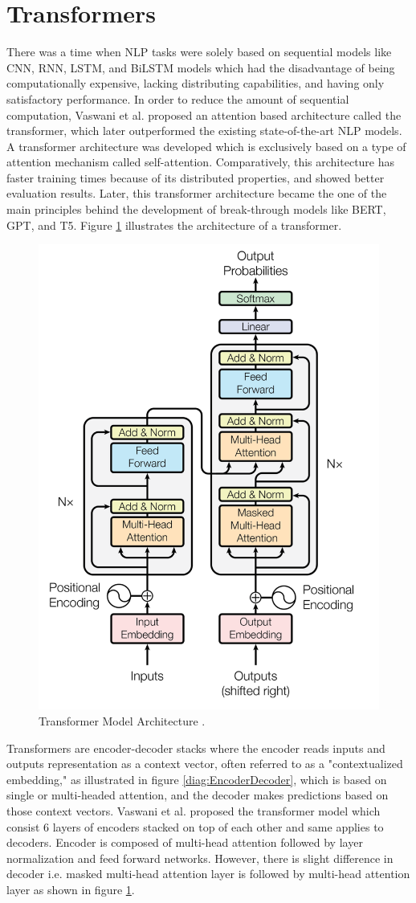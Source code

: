 \documentclass[%
	BCOR=8mm, %
	DIV=12,
	toc=bibliography, %
	toc=listof, %
	oneside, %
	egregdoesnotlikesansseriftitles, %
	]{scrbook}
\begin{document}
\section{Transformers}
\label{section: transformers}
There was a time when NLP tasks were solely based on sequential models like CNN, RNN, LSTM, and BiLSTM models which had the disadvantage of being computationally expensive, lacking distributing capabilities, and having only satisfactory performance. In order to reduce the amount of sequential computation,  Vaswani et al. \cite{vaswani_attention_2017} proposed an attention based architecture called the transformer, which later outperformed the existing state-of-the-art NLP models. A transformer architecture was developed which is exclusively based on a type of attention mechanism called self-attention. Comparatively, this architecture has faster training times because of its distributed properties, and showed better evaluation results. 
Later, this transformer architecture became the one of the main principles behind the development of break-through models like BERT, GPT, and T5. Figure \ref{diag:TransformerArchitecture} illustrates the architecture of a transformer.

\begin{figure}[h!]
    \centering
    \includegraphics[width=.50\textwidth]{img/TransformerArchitecture.png}
    \caption[Architecture diagram of Transformer]{Transformer Model Architecture \cite{vaswani_attention_2017}.}
    \label{diag:TransformerArchitecture}
\end{figure}
Transformers are encoder-decoder stacks where the encoder reads inputs and outputs representation as a context vector, often referred to as a "contextualized embedding," as illustrated in figure \ref{diag:EncoderDecoder}, which is based on single or multi-headed attention, and the decoder makes predictions based on those context vectors. Vaswani et al. \cite{vaswani_attention_2017} proposed the  transformer model which consist 6 layers of encoders stacked on top of each other and same applies to decoders. Encoder is composed of multi-head attention followed by layer normalization and feed forward networks. However, there is slight difference in decoder i.e. masked multi-head attention layer is followed by multi-head attention layer as shown in figure \ref{diag:TransformerArchitecture}.
\end{document}
